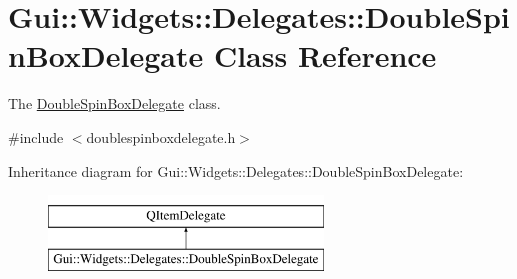 \hypertarget{classGui_1_1Widgets_1_1Delegates_1_1DoubleSpinBoxDelegate}{}\section{Gui\+:\+:Widgets\+:\+:Delegates\+:\+:Double\+Spin\+Box\+Delegate Class Reference}
\label{classGui_1_1Widgets_1_1Delegates_1_1DoubleSpinBoxDelegate}


The \hyperlink{classGui_1_1Widgets_1_1Delegates_1_1DoubleSpinBoxDelegate}{Double\+Spin\+Box\+Delegate} class.  




{\ttfamily \#include $<$doublespinboxdelegate.\+h$>$}

Inheritance diagram for Gui\+:\+:Widgets\+:\+:Delegates\+:\+:Double\+Spin\+Box\+Delegate\+:\begin{figure}[H]
\begin{center}
\leavevmode
\includegraphics[height=2.000000cm]{da/d53/classGui_1_1Widgets_1_1Delegates_1_1DoubleSpinBoxDelegate}
\end{center}
\end{figure}
